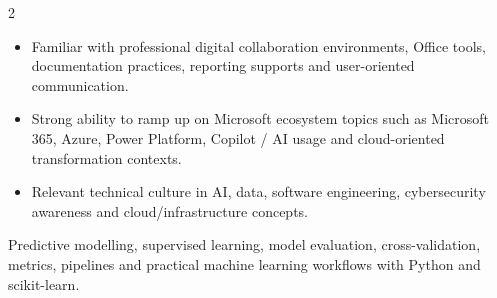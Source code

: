 \documentclass[8pt,a4paper,ragged2e,withhyper]{altacv}
\begin{document}
\begin{paracol}{2}

\begin{itemize}
  \item Familiar with professional digital collaboration environments, Office tools, documentation practices, reporting supports and user-oriented communication.
  \item Strong ability to ramp up on Microsoft ecosystem topics such as Microsoft 365, Azure, Power Platform, Copilot / AI usage and cloud-oriented transformation contexts.
  \item Relevant technical culture in AI, data, software engineering, cybersecurity awareness and cloud/infrastructure concepts.
\end{itemize}


\divider
{}
\divider

\medskip



\divider


\divider


\divider


\end{paracol}



\small{Predictive modelling, supervised learning, model evaluation, cross-validation, metrics, pipelines and practical machine learning workflows with Python and scikit-learn.}

\divider

\end{document}
